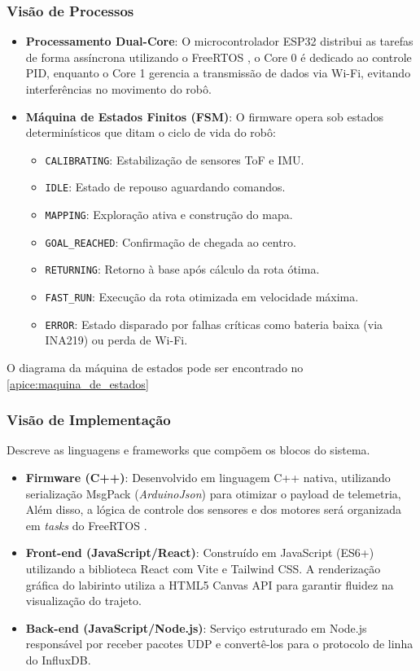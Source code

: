 \subsubsection{Visão de Processos}
\begin{itemize}
    \item \textbf{Processamento Dual-Core}: O microcontrolador ESP32 distribui as tarefas de forma assíncrona utilizando o FreeRTOS \cite{freertos_documentation}, o Core 0 é dedicado ao controle PID, enquanto o Core 1 gerencia a transmissão de dados via Wi-Fi, evitando interferências no movimento do robô.
    \item \textbf{Máquina de Estados Finitos (FSM)}: O firmware opera sob estados determinísticos que ditam o ciclo de vida do robô:
    \begin{itemize}
        \item \texttt{CALIBRATING}: Estabilização de sensores ToF e IMU.
        \item \texttt{IDLE}: Estado de repouso aguardando comandos.
        \item \texttt{MAPPING}: Exploração ativa e construção do mapa.
        \item \texttt{GOAL\_REACHED}: Confirmação de chegada ao centro.
        \item \texttt{RETURNING}: Retorno à base após cálculo da rota ótima.
        \item \texttt{FAST\_RUN}: Execução da rota otimizada em velocidade máxima.
        \item \texttt{ERROR}: Estado disparado por falhas críticas como bateria baixa (via INA219) ou perda de Wi-Fi.
    \end{itemize}
\end{itemize}
O diagrama da máquina de estados pode ser encontrado no \autoref{apice:maquina_de_estados}

\subsubsection{Visão de Implementação}
Descreve as linguagens e frameworks que compõem os blocos do sistema.

\begin{itemize}
    \item \textbf{Firmware (C++)}: Desenvolvido em linguagem C++ nativa, utilizando serialização MsgPack (\textit{ArduinoJson}) para otimizar o payload de telemetria, Além disso, a lógica de controle dos sensores e dos motores será organizada em \textit{tasks} do FreeRTOS \cite{freertos_documentation}.
    \item \textbf{Front-end (JavaScript/React)}: Construído em JavaScript (ES6+) utilizando a biblioteca React com Vite e Tailwind CSS. A renderização gráfica do labirinto utiliza a HTML5 Canvas API para garantir fluidez na visualização do trajeto.
    \item \textbf{Back-end (JavaScript/Node.js)}: Serviço estruturado em Node.js responsável por receber pacotes UDP e convertê-los para o protocolo de linha do InfluxDB.
\end{itemize}

